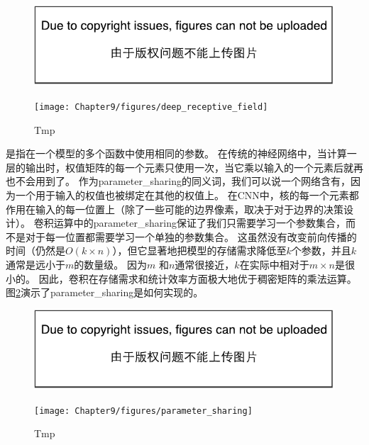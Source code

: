 \begin{figure}[!htb]
\ifOpenSource
\centerline{\includegraphics{figure.pdf}}
\else
\centerline{\texttt{[image: Chapter9/figures/deep\_receptive\_field]}}
\fi
\caption{Tmp}
\label{fig:chap9_deep_receptive_field}
\end{figure}

 
是指在一个模型的多个函数中使用相同的参数。
在传统的神经网络中，当计算一层的输出时，权值矩阵的每一个元素只使用一次，当它乘以输入的一个元素后就再也不会用到了。
作为\gls{parameter_sharing}的同义词，我们可以说一个网络含有，因为一个用于输入的权值也被绑定在其他的权值上。
在\gls{CNN}中，核的每一个元素都作用在输入的每一位置上（除了一些可能的边界像素，取决于对于边界的决策设计）。
卷积运算中的\gls{parameter_sharing}保证了我们只需要学习一个参数集合，而不是对于每一位置都需要学习一个单独的参数集合。
这虽然没有改变前向传播的时间（仍然是$O(k\times n)$），但它显著地把模型的存储需求降低至$k$个参数，并且$k$通常是远小于$m$的数量级。
因为$m$ 和$n$通常很接近，$k$在实际中相对于$m\times n$是很小的。
因此，卷积在存储需求和统计效率方面极大地优于稠密矩阵的乘法运算。
图\ref{fig:chap9_parameter_sharing}演示了\gls{parameter_sharing}是如何实现的。
\begin{figure}[!htb]
\ifOpenSource
\centerline{\includegraphics{figure.pdf}}
\else
\centerline{\texttt{[image: Chapter9/figures/parameter\_sharing]}}
\fi
\caption{Tmp}
\label{fig:chap9_parameter_sharing}
\end{figure}
 
 

